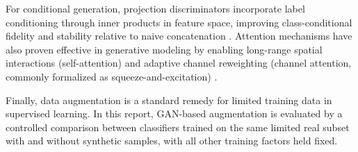 For conditional generation, projection discriminators incorporate label conditioning through inner products in feature space, improving class-conditional fidelity and stability relative to naive concatenation \citep{miyato2018projection}. Attention mechanisms have also proven effective in generative modeling by enabling long-range spatial interactions (self-attention) and adaptive channel reweighting (channel attention, commonly formalized as squeeze-and-excitation) \citep{zhang2019sagan,hu2018senet}.

Finally, data augmentation is a standard remedy for limited training data in supervised learning. In this report, GAN-based augmentation is evaluated by a controlled comparison between classifiers trained on the same limited real subset with and without synthetic samples, with all other training factors held fixed.


